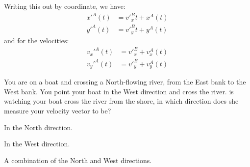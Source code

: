 
Writing this out by coordinate, we have:
\begin{align*}
x'^A(t)&=v'^B_xt+x^A(t)\\
y'^A(t)&=v'^B_yt+y^A(t)
\end{align*}
and for the velocities:
\begin{align*}
v_x'^A(t)&=v'^B_x+v_x^A(t)\\
v_y'^A(t)&=v'^B_y+v_y^A(t)
\end{align*}


\begin{checkpoint}{\begin{MCquestion}{You are on a boat and crossing a North-flowing river, from the East bank to the West bank. You point your boat in the West direction and cross the river. \chloe is watching your boat cross the river from the shore, in which direction does she measure your velocity vector to be?}
\item In the North direction.
\item In the West direction.
\item A combination of the North and West directions.
\end{MCquestion}}
\end{checkpoint}


